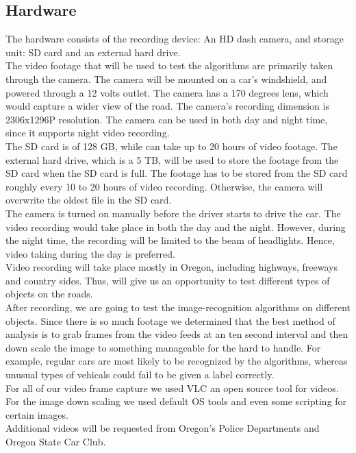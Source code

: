 \documentclass[10pt,draftclsnofoot,onecolumn,journal,compsoc]{IEEEtran}
\begin{document}
\subsection{Hardware}
The hardware consists of the recording device: An HD dash camera, and storage unit: SD card and an external hard drive.\\
The video footage that will be used to test the algorithms are primarily taken through the camera. The camera will be mounted on a car's windshield, and powered through a 12 volts outlet. The camera has a 170 degrees lens, which would capture a wider view of the road. The camera's recording dimension is 2306x1296P resolution. The camera can be used in both day and night time, since it supports night video recording.\\
The SD card is of 128 GB, while can take up to 20 hours of video footage. The external hard drive, which is a 5 TB, will be used to store the footage from the SD card when the SD card is full. The footage has to be stored from the SD card roughly every 10 to 20 hours of video recording. Otherwise, the camera will overwrite the oldest file in the SD card.\\
The camera is turned on manually before the driver starts to drive the car. The video recording would take place in both the day and the night. However, during the night time, the recording will be limited to the beam of headlights. Hence, video taking during the day is preferred. \\
Video recording will take place mostly in Oregon, including highways, freeways and country sides. Thus, will give us an opportunity to test different types of objects on the roads. \\
After recording, we are going to test the image-recognition algorithms on different objects. Since there is so much footage we determined that the best method of analysis is to grab frames from the video feeds at an ten second interval and then down scale the image to something manageable for the hard to handle. For example, regular cars are most likely to be recognized by the algorithms, whereas unusual types of vehicals could fail to be given a label correctly.\\
For all of our video frame capture we used VLC an open source tool for videos. For the image down scaling we used default OS tools and even some scripting for certain images.\\
Additional videos will be requested from Oregon's Police Departments and Oregon State Car Club.
\end{document}
